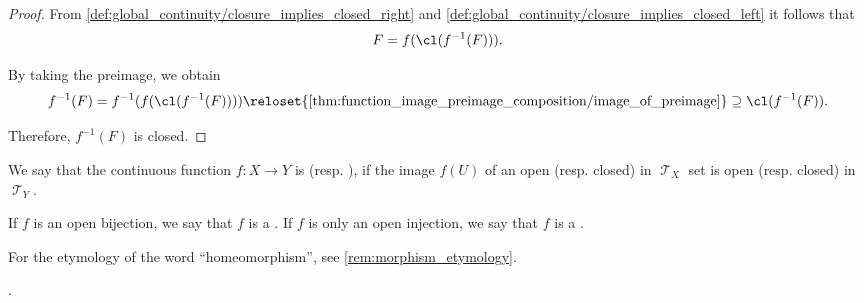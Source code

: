 \begin{proof}
  From \eqref{def:global_continuity/closure_implies_closed_right} and \eqref{def:global_continuity/closure_implies_closed_left} it follows that
  \begin{equation*}
    F = f(\cl(f^{-1}(F))).
  \end{equation*}

  By taking the preimage, we obtain
  \begin{equation*}
    f^{-1}(F)
    =
    f^{-1}(f(\cl(f^{-1}(F))))
    \reloset {\ref{thm:function_image_preimage_composition/image_of_preimage}} \supseteq
    \cl(f^{-1}(F)).
  \end{equation*}

  Therefore, \( f^{-1}(F) \) is closed.
\end{proof}

\begin{definition}\label{def:homeomorphism}
  We say that the continuous function \( f: X \to Y \) is  (resp. ), if the image \( f(U) \) of an open (resp. closed) in \( \mscrT_X \) set is open (resp. closed) in \( \mscrT_Y \).

  If \( f \) is an open bijection, we say that \( f \) is a . If \( f \) is only an open injection, we say that \( f \) is a .
\end{definition}
\begin{comments}
  \item For the etymology of the word \enquote{homeomorphism}, see \cref{rem:morphism_etymology}.
\end{comments}

\begin{definition}\label{def:diffeomorphism}
  \todo{}
\end{definition}

\begin{definition}\label{def:homotopy}
\end{definition}

\begin{definition}\label{def:fundamental_groupoid}
  .
\end{definition}
